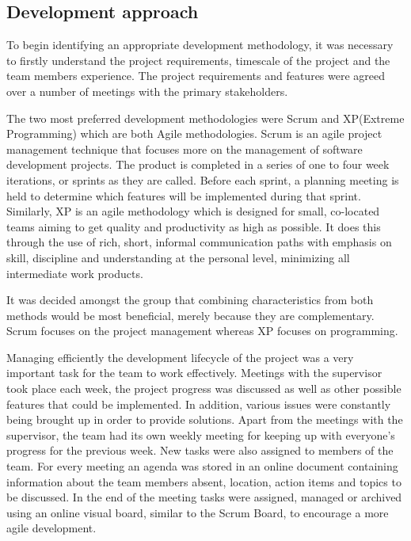 \subsection{Development approach} 
To begin identifying an appropriate development methodology, it was necessary to firstly understand 
the project requirements, timescale of the project and the team members experience. The project requirements and features were agreed over a number of 
meetings with the primary stakeholders.

The two most preferred development methodologies were 
Scrum and XP(Extreme Programming) which are both Agile methodologies. Scrum is an agile project management technique that focuses more 
on the management of software development projects. The product is completed in a series of one to 
four week iterations, or sprints as they are called. Before each sprint, a planning meeting is held 
to determine which features will be implemented during that sprint. Similarly, XP is an agile 
methodology which is designed for small, co-located teams aiming to get quality and productivity as 
high as possible. It does this through the use of rich, short, informal communication paths with 
emphasis on skill, discipline and understanding at the personal level, minimizing all intermediate 
work products. 

It was decided amongst the group that combining characteristics from both methods 
would be most beneficial, merely because they are complementary. Scrum focuses on the project management 
whereas XP focuses on programming.\cite{ScrumXP}

Managing efficiently the development lifecycle of the project was a very 
important task for the team to work effectively. Meetings with the supervisor took place each week, 
the project progress was discussed as well as other possible features that could be implemented. 
In addition, various issues were constantly being brought up in order to provide solutions. Apart from 
the meetings with the supervisor, the team had its own weekly meeting for keeping up with 
everyone's progress for the previous week. New tasks were also assigned to members of the team. For 
every meeting an agenda was stored in an online document containing information about the team 
members absent, location, action items and topics to be discussed. In the end of the meeting tasks 
were assigned, managed or archived using an online visual board, similar to the Scrum Board, to 
encourage a more agile development.

